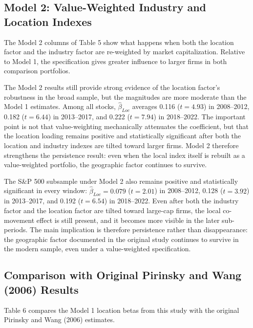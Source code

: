 \documentclass[
  12pt,
]{article}
\begin{document}
\subsection{Model 2: Value-Weighted Industry and Location
Indexes}\label{model-2-value-weighted-industry-and-location-indexes}

The Model 2 columns of Table 5 show what happens when both the location
factor and the industry factor are re-weighted by market capitalization.
Relative to Model 1, the specification gives greater influence to larger
firms in both comparison portfolios.

The Model 2 results still provide strong evidence of the location
factor's robustness in the broad sample, but the magnitudes are more
moderate than the Model 1 estimates. Among all stocks,
\(\hat{\beta}_{Loc}\) averages 0.116 (\(t=4.93\)) in 2008--2012, 0.182
(\(t=6.44\)) in 2013--2017, and 0.222 (\(t=7.94\)) in 2018--2022. The
important point is not that value-weighting mechanically attenuates the
coefficient, but that the location loading remains positive and
statistically significant after both the location and industry indexes
are tilted toward larger firms. Model 2 therefore strengthens the
persistence result: even when the local index itself is rebuilt as a
value-weighted portfolio, the geographic factor continues to survive.

The S\&P 500 subsample under Model 2 also remains positive and
statistically significant in every window: \(\hat{\beta}_{Loc}=0.079\)
(\(t=2.01\)) in 2008--2012, 0.128 (\(t=3.92\)) in 2013--2017, and 0.192
(\(t=6.54\)) in 2018--2022. Even after both the industry factor and the
location factor are tilted toward large-cap firms, the local co-movement
effect is still present, and it becomes more visible in the later
sub-periods. The main implication is therefore persistence rather than
disappearance: the geographic factor documented in the original study
continues to survive in the modern sample, even under a value-weighted
specification.

\subsection{Comparison with Original Pirinsky and Wang (2006)
Results}\label{comparison-with-original-pirinsky-and-wang-2006-results}

Table 6 compares the Model 1 location betas from this study with the
original Pirinsky and Wang (2006) estimates.
\end{document}
